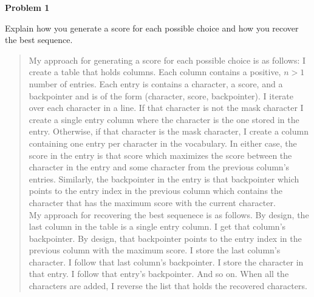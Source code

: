 {\bf Problem 1}

Explain how you generate a score for each possible choice and how you recover the best sequence.
\begin{quote}
My approach for generating a score for each possible choice is as follows:
I create a table that holds columns. 
Each column contains a positive, $n>1$ number of entries.
Each entry is contains a character, a score, and a backpointer and is of the form (character, score, backpointer).
I iterate over each character in a line. 
If that character is not the mask character I create a single entry column where the character is the one stored in the entry.
Otherwise, if that character is the mask character, I create a column containing one entry per character in the vocabulary.
In either case, the score in the entry is that score which maximizes the score between the character in the entry and some character from the previous column's entries.
Similarly, the backpointer in the entry is that backpointer which points to the entry index in the previous column which contains the character that has the maximum score with the current character. \\

My approach for recovering the best sequenece is as follows. 
By design, the last column in the table is a single entry column. 
I get that column's backpointer. 
By design, that backpointer points to the entry index in the previous column with the maximum score. 
I store the last column's character. 
I follow that last column's backpointer.
I store the character in that entry. 
I follow that entry's backpointer. 
And so on. 
When all the characters are added, I reverse the list that holds the recovered characters.
\end{quote}
